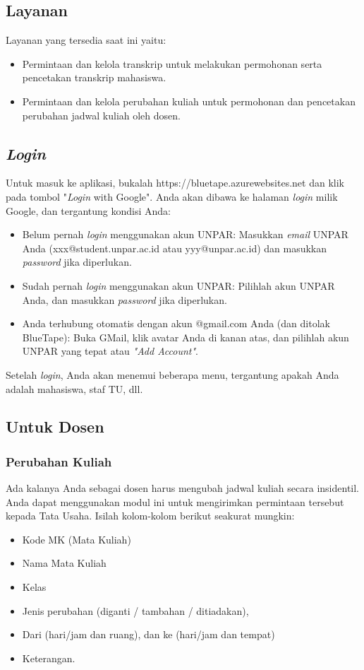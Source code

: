 \subsection{Layanan}
\label{sec:bluetape_layanan}
Layanan yang tersedia saat ini yaitu:
\begin{itemize}
	\item Permintaan dan kelola transkrip untuk melakukan permohonan serta pencetakan transkrip mahasiswa.
	\item Permintaan dan kelola perubahan kuliah untuk permohonan dan pencetakan perubahan jadwal kuliah oleh dosen.
\end{itemize}

\subsection{\textit{Login}}
\label{sec:bluetape_login}
Untuk masuk ke aplikasi, bukalah https://bluetape.azurewebsites.net dan klik pada tombol "\textit{Login} with Google". Anda akan dibawa ke halaman \textit{login} milik Google, dan tergantung kondisi Anda:
\begin{itemize}
	\item Belum pernah \textit{login} menggunakan akun UNPAR: Masukkan \textit{email} UNPAR Anda (xxx@student.unpar.ac.id atau yyy@unpar.ac.id) dan masukkan \textit{password} jika diperlukan.
	\item Sudah pernah \textit{login} menggunakan akun UNPAR: Pilihlah akun UNPAR Anda, dan masukkan \textit{password} jika diperlukan.
	\item Anda terhubung otomatis dengan akun @gmail.com Anda (dan ditolak BlueTape): Buka GMail, klik avatar Anda di kanan atas, dan pilihlah akun UNPAR yang tepat atau \textit{"Add Account"}.
\end{itemize}

Setelah \textit{login}, Anda akan menemui beberapa menu, tergantung apakah Anda adalah mahasiswa, staf TU, dll.

\subsection{Untuk Dosen}
\label{sec:bluetape_dosen}

\subsubsection{Perubahan Kuliah}
\label{sec:bluetape_perubahan_kuliah}
Ada kalanya Anda sebagai dosen harus mengubah jadwal kuliah secara insidentil. Anda dapat menggunakan modul ini untuk mengirimkan permintaan tersebut kepada Tata Usaha. Isilah kolom-kolom berikut seakurat mungkin:
\begin{itemize}
	\item Kode MK (Mata Kuliah)
	\item Nama Mata Kuliah
	\item Kelas
	\item Jenis perubahan (diganti / tambahan / ditiadakan),
	\item Dari (hari/jam dan ruang), dan ke (hari/jam dan tempat)
	\item Keterangan.
\end{itemize}

